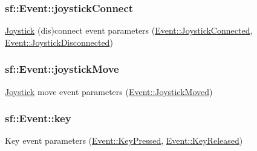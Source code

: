 \hypertarget{classsf_1_1_event_aa354335c9ad73362442bc54ffe81118f}{
\subsubsection[{joystick\-Connect}]{ sf\-::\-Event\-::joystick\-Connect}}\label{classsf_1_1_event_aa354335c9ad73362442bc54ffe81118f}


\hyperlink{classsf_1_1_joystick}{Joystick} (dis)connect event parameters (\hyperlink{classsf_1_1_event_af41fa9ed45c02449030699f671331d4aa103511bbaf4d9710be5028510b80a011}{Event\-::\-Joystick\-Connected}, \hyperlink{classsf_1_1_event_af41fa9ed45c02449030699f671331d4aa8f4151bb75a0eec34a2950ea9d341894}{Event\-::\-Joystick\-Disconnected}) 

\hypertarget{classsf_1_1_event_ac479e8351cc2024d5c1094dc33970f7f}{
\subsubsection[{joystick\-Move}]{ sf\-::\-Event\-::joystick\-Move}}\label{classsf_1_1_event_ac479e8351cc2024d5c1094dc33970f7f}


\hyperlink{classsf_1_1_joystick}{Joystick} move event parameters (\hyperlink{classsf_1_1_event_af41fa9ed45c02449030699f671331d4aac6e368e4ec275235dbab7e782d857d52}{Event\-::\-Joystick\-Moved}) 

\hypertarget{classsf_1_1_event_a45b92fc6757ca7c193f06b302e424ab0}{
\subsubsection[{key}]{ sf\-::\-Event\-::key}}\label{classsf_1_1_event_a45b92fc6757ca7c193f06b302e424ab0}


Key event parameters (\hyperlink{classsf_1_1_event_af41fa9ed45c02449030699f671331d4aaadc5747df45354b4d2c89558c3f0d1a4}{Event\-::\-Key\-Pressed}, \hyperlink{classsf_1_1_event_af41fa9ed45c02449030699f671331d4aa1df4a1c59bf3a4613f3d577ce137b8f1}{Event\-::\-Key\-Released}) 

